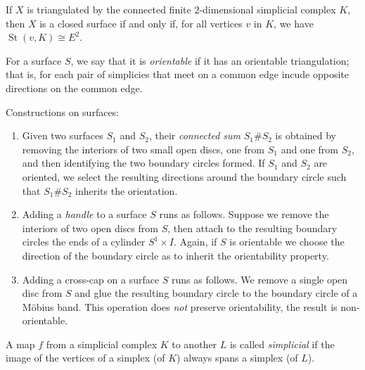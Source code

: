 \documentclass[a4paper]{article}
\begin{document}
\begin{corollary}
	If $X$ is triangulated by the connected finite $2$-dimensional
	simplicial complex $K$, then $X$ is a closed surface if and only if, for
	all vertices $v$ in $K$, we have $\operatorname{St}(v,K) \cong E^2$.
\end{corollary}

\begin{definition}[Orientability]
	For a surface $S$, we say that it is \emph{orientable}
	if it has an orientable triangulation; that is, for each pair
	of simplicies that meet on a common edge incude opposite directions
	on the common edge.
\end{definition}

Constructions on surfaces:
\begin{enumerate}
	\item Given two surfaces $S_1$ and $S_2$, their \emph{connected sum} 
	$S_1 \# S_2$ is obtained by removing the interiors of two small open discs,
	one from $S_1$ and one from $S_2$, and then identifying the two boundary
	circles formed. 
	If $S_1$ and $S_2$ are oriented, we select the resulting directions
	around the boundary circle such that $S_1 \# S_2$ inherits
	the orientation.
	
	\item Adding a \emph{handle} to a surface $S$ runs as follows.
	Suppose we remove the interiors of two open discs from $S$, then attach
	to the resulting boundary circles the ends of a cylinder
	$S^1 \times I$. Again, if $S$ is orientable we choose the direction
	of the boundary circle as to inherit the orientability property.

	\item Adding a cross-cap on a surface $S$ runs as follows.
	We remove a single open disc from $S$ and glue the resulting boundary circle to the boundary circle of a M\"obius band.
	This operation does \emph{not} preserve orientability,
	the result is non-orientable.
\end{enumerate}

\begin{definition}
	A map $f$ from a simplicial complex $K$ to another $L$ is
	called \emph{simplicial} if the image of the vertices of a simplex
	(of $K$) always spans a simplex (of $L$).
\end{definition}
\end{document}
